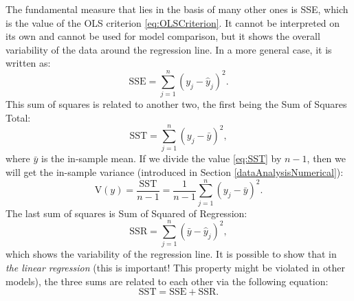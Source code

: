 \documentclass[
]{book}
\theoremstyle{definition}
\theoremstyle{definition}
\theoremstyle{definition}
\theoremstyle{definition}
\theoremstyle{remark}
\begin{document}
The fundamental measure that lies in the basis of many other ones is SSE, which is the value of the OLS criterion \eqref{eq:OLSCriterion}. It cannot be interpreted on its own and cannot be used for model comparison, but it shows the overall variability of the data around the regression line. In a more general case, it is written as:
\begin{equation}
    \mathrm{SSE} = \sum_{j=1}^n (y_j - \hat{y}_j)^2 .
    \label{eq:SSE}
\end{equation}
This sum of squares is related to another two, the first being the Sum of Squares Total:
\begin{equation}
    \mathrm{SST}=\sum_{j=1}^n (y_j - \bar{y})^2,
    \label{eq:SST}
\end{equation}
where \(\bar{y}\) is the in-sample mean. If we divide the value \eqref{eq:SST} by \(n-1\), then we will get the in-sample variance (introduced in Section \ref{dataAnalysisNumerical}):
\begin{equation*}
    \mathrm{V}(y)=\frac{\mathrm{SST}}{n-1}=\frac{1}{n-1} \sum_{j=1}^n (y_j - \bar{y})^2 .
\end{equation*}
The last sum of squares is Sum of Squared of Regression:
\begin{equation}
    \mathrm{SSR} = \sum_{j=1}^n (\bar{y} - \hat{y}_j)^2 ,
    \label{eq:SSR}
\end{equation}
which shows the variability of the regression line. It is possible to show that in \emph{the linear regression} (this is important! This property might be violated in other models), the three sums are related to each other via the following equation:
\begin{equation}
    \mathrm{SST} = \mathrm{SSE} + \mathrm{SSR} .
    \label{eq:SSTSum}
\end{equation}
\end{document}
